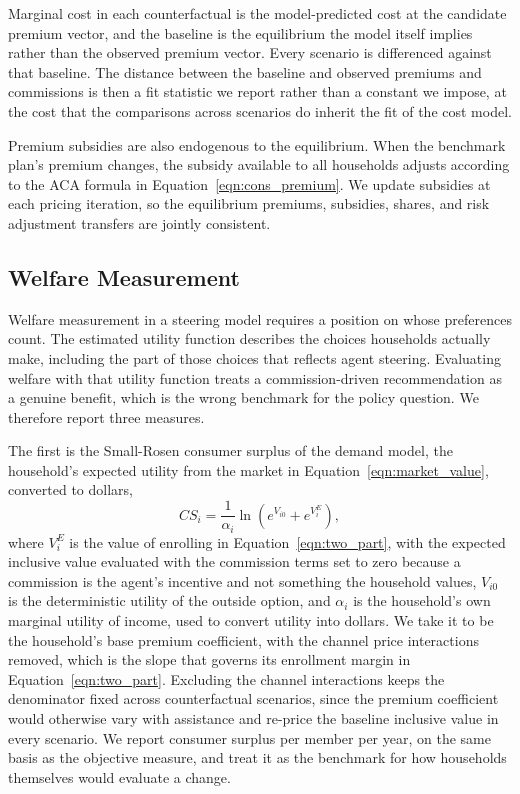 \documentclass[12pt]{article}
\begin{document}
Marginal cost in each counterfactual is the model-predicted cost at the candidate premium vector, and the baseline is the equilibrium the model itself implies rather than the observed premium vector. Every scenario is differenced against that baseline. The distance between the baseline and observed premiums and commissions is then a fit statistic we report rather than a constant we impose, at the cost that the comparisons across scenarios do inherit the fit of the cost model.

Premium subsidies are also endogenous to the equilibrium. When the benchmark plan's premium changes, the subsidy available to all households adjusts according to the ACA formula in Equation~\eqref{eqn:cons_premium}. We update subsidies at each pricing iteration, so the equilibrium premiums, subsidies, shares, and risk adjustment transfers are jointly consistent.

\subsection{Welfare Measurement}
\label{subsec:welfare_measurement}

Welfare measurement in a steering model requires a position on whose preferences count. The estimated utility function describes the choices households actually make, including the part of those choices that reflects agent steering. Evaluating welfare with that utility function treats a commission-driven recommendation as a genuine benefit, which is the wrong benchmark for the policy question. We therefore report three measures.

The first is the Small-Rosen consumer surplus \citep{small1981} of the demand model, the household's expected utility from the market in Equation~\eqref{eqn:market_value}, converted to dollars,
\begin{equation}
\label{eqn:cs}
CS_i = \frac{1}{\alpha_i} \ln\left(e^{V_{i0}} + e^{V^E_{i}}\right),
\end{equation}
where $V^E_i$ is the value of enrolling in Equation~\eqref{eqn:two_part}, with the expected inclusive value evaluated with the commission terms set to zero because a commission is the agent's incentive and not something the household values, $V_{i0}$ is the deterministic utility of the outside option, and $\alpha_i$ is the household's own marginal utility of income, used to convert utility into dollars. We take it to be the household's base premium coefficient, with the channel price interactions removed, which is the slope that governs its enrollment margin in Equation~\eqref{eqn:two_part}. Excluding the channel interactions keeps the denominator fixed across counterfactual scenarios, since the premium coefficient would otherwise vary with assistance and re-price the baseline inclusive value in every scenario. We report consumer surplus per member per year, on the same basis as the objective measure, and treat it as the benchmark for how households themselves would evaluate a change.
\end{document}
